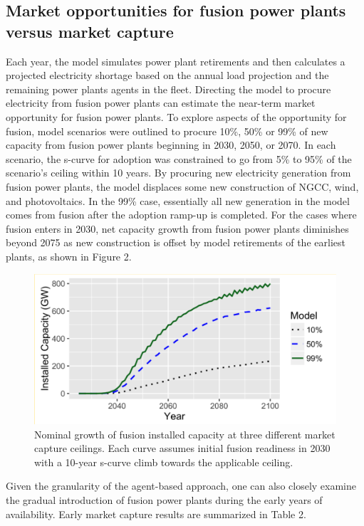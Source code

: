 \documentclass[preprint, 12pt]{elsarticle}
\begin{document}
\subsection{Market opportunities for fusion power plants versus market capture}

Each year, the model simulates power plant retirements and then calculates a projected electricity shortage based on the annual load projection and the remaining power plants agents in the fleet. Directing the model to procure electricity from fusion power plants can estimate the near-term market opportunity for fusion power plants. To explore aspects of the opportunity for fusion, model scenarios were outlined to procure 10\%, 50\% or 99\% of new capacity from fusion power plants beginning in 2030, 2050, or 2070. In each scenario, the s-curve for adoption was constrained to go from 5\% to 95\% of the scenario’s ceiling within 10 years. By procuring new electricity generation from fusion power plants, the model displaces some new construction of NGCC, wind, and photovoltaics. In the 99\% case, essentially all new generation in the model comes from fusion after the adoption ramp-up is completed. For the cases where fusion enters in 2030, net capacity growth from fusion power plants diminishes beyond 2075 as new construction is offset by model retirements of the earliest plants, as shown in Figure 2.

\begin{figure}
\begin{center}
\includegraphics[scale=.35]{Fig4_4.png}
\end{center}
\caption{Nominal growth of fusion installed capacity at three different market capture ceilings. Each curve assumes initial fusion readiness in 2030 with a 10-year s-curve climb towards the applicable ceiling.}
\end{figure}

Given the granularity of the agent-based approach, one can also closely examine the gradual introduction of fusion power plants during the early years of availability. Early market capture results are summarized in Table 2.
\end{document}
